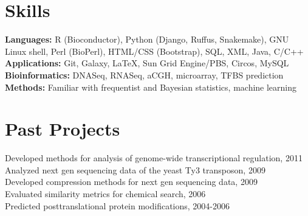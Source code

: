 \documentclass[margin,line]{res}
\begin{document}
\begin{resume}
\section{Skills} 
\textbf{Languages:} R (Bioconductor), Python (Django, Ruffus, Snakemake), GNU Linux shell, Perl (BioPerl), HTML/CSS (Bootstrap), SQL, XML, Java, C/C++\\
\textbf{Applications:} Git, Galaxy, \LaTeX, Sun Grid Engine/PBS, Circos, MySQL\\
\textbf{Bioinformatics:} DNASeq, RNASeq, aCGH, microarray, TFBS prediction\\
\textbf{Methods:} Familiar with frequentist and Bayesian statistics, machine learning


\section{Past Projects}
Developed methods for analysis of genome-wide transcriptional regulation, 2011 \\
Analyzed next gen sequencing data of the yeast Ty3 transposon, 2009\\
Developed compression methods for next gen sequencing data, 2009 \\
Evaluated similarity metrics for chemical search, 2006\\
Predicted posttranslational protein modifications, 2004-2006


\end{resume}
\end{document}
